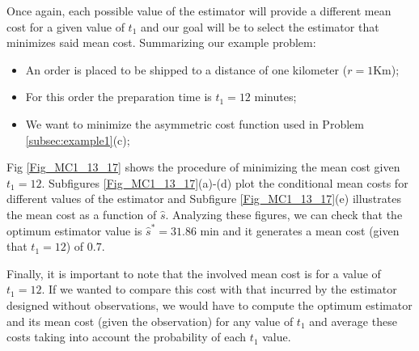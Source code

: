 \begin{solution}
\begin{itemize}
Once again, each possible value of the estimator will provide a different mean cost for a given value of $t_1$ and our goal will be to select the estimator that minimizes said mean cost. 
Summarizing our example problem:
\begin{itemize}
\item An order is placed to be shipped to a distance of one kilometer ($r=1$Km);
\item For this order the preparation time is $t_1=12$ minutes;
\item We want to minimize the asymmetric cost function used in Problem \ref{subsec:example1}(c);
\end{itemize}
Fig \ref{Fig_MC1_13_17} shows the procedure of minimizing the mean cost given $t_1=12$. Subfigures \ref{Fig_MC1_13_17}(a)-(d) plot the conditional mean costs for different values of the estimator and Subfigure \ref{Fig_MC1_13_17}(e) illustrates the mean cost as a function of $\hat{s}$. Analyzing these figures, we can check that the optimum estimator value is $\hat{s}^{*} = 31.86$ min and it generates a mean cost (given that $t_1 = 12$) of $0.7$.

Finally, it is important to note that the involved mean cost is for a value of $t_1=12$. If we wanted to compare this cost with that incurred by the estimator designed without observations, we would have to compute the optimum estimator and its mean cost (given the observation) for any value of $t_1$ and average these costs taking into account the probability of each $t_1$ value. %

\end{itemize}
    
\end{solution}

